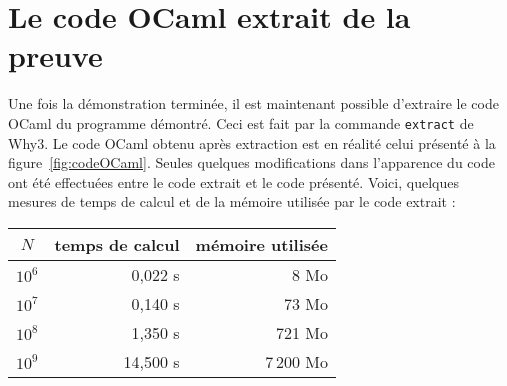 \documentclass[a4paper]{easychair}
\begin{document}

\section{Le code OCaml extrait de la preuve}
\label{sec:extraction}

Une fois la démonstration terminée, il est maintenant possible d'extraire
le code OCaml du programme démontré. Ceci est fait par la commande
\texttt{extract} de Why3.
Le code OCaml obtenu après extraction est en réalité celui présenté
à la figure~\ref{fig:codeOCaml}.
Seules quelques modifications dans l'apparence du code ont été effectuées
entre le code extrait et le code présenté.
Voici, quelques mesures de temps de calcul et de la mémoire utilisée par
le code extrait :
\begin{center}
  \begin{tabular}{|c|r|r|}
    \hline
    $N$ & temps de calcul & mémoire utilisée \\
    \hline\hline
    $10^6$ &  0,022 s &      8 Mo \\\hline
    $10^7$ &  0,140 s &     73 Mo \\\hline
    $10^8$ &  1,350 s &    721 Mo \\\hline
    $10^9$ & 14,500 s & 7\,200 Mo \\\hline
  \end{tabular}
\end{center}

\end{document}
